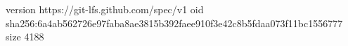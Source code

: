version https://git-lfs.github.com/spec/v1
oid sha256:6a4ab562726e97faba8ae3815b392faee910f3e42c8b5fdaa073f11bc1556777
size 4188
